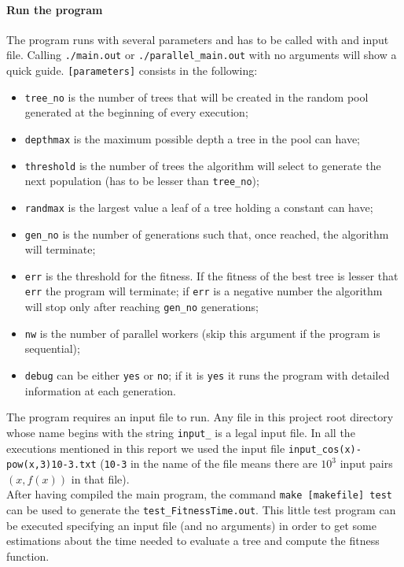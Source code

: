 \documentclass[10pt]{article}
\numberwithin{equation}{section}
\begin{document}
\begin{itemize}
\paragraph{Run the program}
The program runs with several parameters and has to be called with and input file. Calling \verb|./main.out| or \verb|./parallel_main.out| with no arguments will show a quick guide. \verb|[parameters]| consists in the following: 
\begin{itemize}
	\item \verb|tree_no| is the number of trees that will be created in the random pool generated at the beginning of every execution;
	\item \verb|depthmax| is the maximum possible depth a tree in the pool can have;
	\item \verb|threshold| is the number of trees the algorithm will select to generate the next population (has to be lesser than \verb|tree_no|);
	\item \verb|randmax| is the largest value a leaf of a tree holding a constant can have;
	\item \verb|gen_no| is the number of generations such that, once reached, the algorithm will terminate;
	\item \verb|err| is the threshold for the fitness. If the fitness of the best tree is lesser that \verb|err| the program will terminate; if \verb|err| is a negative number the algorithm will stop only after reaching \verb|gen_no| generations;
	\item \verb|nw| is the number of parallel workers (skip this argument if the program is sequential);
	\item \verb|debug| can be either \verb|yes| or \verb|no|; if it is \verb|yes| it runs the program with detailed information at each generation.	   
\end{itemize}
The program requires an input file to run. Any file in this project root directory whose name begins with the string \verb|input_| is a legal input file. In all the executions mentioned in this report we used the input file \verb|input_cos(x)-pow(x,3)10-3.txt| (\verb|10-3| in the name of the file means there are $10^3$ input pairs $(x,f(x))$ in that file).\\
After having compiled the main program, the command \verb|make [makefile] test| can be used to generate the \verb|test_FitnessTime.out|. This little test program can be executed specifying an input file (and no arguments) in order to get some estimations about the time needed to evaluate a tree and compute the fitness 	function.
\end{itemize}
\end{document}
